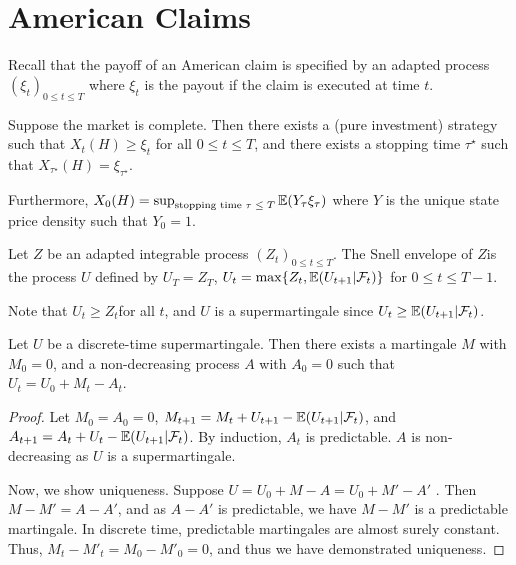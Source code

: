 \section{American Claims}
\label{sec:american-claims}

Recall that the payoff of an American claim is specified by an adapted
process $(\xi_{t})_{0 \leq t \leq T}$ where $\xi_{t}$ is the payout if
the claim is executed at time $t$.

\begin{thm}
  \label{defn:discrete_time_models:29}
  Suppose the market is complete.  Then there exists a (pure
  investment) strategy such that $X_{t}(H) \geq \xi_{t}$ for all $0
  \leq t \leq T$, and there exists a stopping time $\tau^{\star}$ such
  that $X_{\tau^{\star}}(H) = \xi_{\tau^{\star}}$.

  Furthermore, $X_{0}(H) = \sup_{\text{stopping time $\tau \leq T$}}
  \E{Y_{\tau} \xi_{\tau}}$ where $Y$ is the unique state price density
  such that $Y_{0} = 1$.
\end{thm}

\begin{defn}
  \label{defn:discrete_time_models:30}
  Let $Z$ be an adapted integrable process $(Z_{t})_{0 \leq t \leq
    T}$.  The Snell envelope of $Z$is the process $U$ defined by
  $U_{T}= Z_{T}$, $U_{t} = \max \{ Z_{t}, \E{U_{t + 1} |
    \mathcal{F}_{t} } \}$ for $0 \leq t \leq T - 1$.
\end{defn}

\begin{remark}
  Note that $U_{t} \geq Z_{t}$for all $t$, and $U$ is a supermartingale
  since $U_{t} \geq \E{U_{t+1} | \mathcal{F}_{t}}$.
\end{remark}

\begin{thm}
  \label{defn:discrete_time_models:31}
  Let $U$ be a discrete-time supermartingale.  Then there exists a
  martingale $M$ with $M_{0} = 0$, and a non-decreasing process $A$
  with $A_{0} = 0$ such that $U_{t} = U_{0} + M_{t} - A_{t}$.
\end{thm}

\begin{proof}
  Let $M_{0} = A_{0} = 0$, $M_{t+1} = M_{t} + U_{t+1} - \E{U_{t+1} |
    \mathcal{F}_{t}}$, and $A_{t+1} = A_{t} + U_{t} - \E{U_{t+1} |
    \mathcal{F}_{t}}$.  By induction, $A_{t}$ is predictable.  $A$ is
  non-decreasing as $U$ is a supermartingale.

  Now, we show uniqueness.  Suppose $U = U_{0} + M - A = U_{0} + M' -
  A'$ .  Then $M - M' = A - A'$, and as $A - A'$ is predictable, we
  have $M - M'$ is a predictable martingale.  In discrete time,
  predictable martingales are almost surely constant.  Thus, $M_{t} -
  M'_{t} = M_{0} - M'_{0} = 0$, and thus we have demonstrated uniqueness.
\end{proof}

